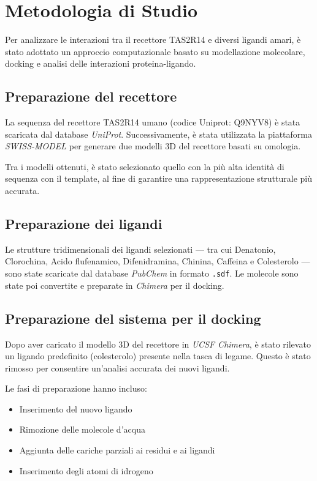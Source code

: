 \documentclass[12pt, a4paper]{book}
\begin{document}
\chapter{Metodologia di Studio}

Per analizzare le interazioni tra il recettore TAS2R14 e diversi ligandi amari, è stato adottato un approccio computazionale basato su modellazione molecolare, docking e analisi delle interazioni proteina-ligando.

\section*{Preparazione del recettore}
La sequenza del recettore TAS2R14 umano (codice Uniprot: Q9NYV8) è stata scaricata dal database \textit{UniProt}. Successivamente, è stata utilizzata la piattaforma \textit{SWISS-MODEL} per generare due modelli 3D del recettore basati su omologia.

Tra i modelli ottenuti, è stato selezionato quello con la più alta identità di sequenza con il template, al fine di garantire una rappresentazione strutturale più accurata.

\section*{Preparazione dei ligandi}
Le strutture tridimensionali dei ligandi selezionati — tra cui Denatonio, Clorochina, Acido flufenamico, Difenidramina, Chinina, Caffeina e Colesterolo — sono state scaricate dal database \textit{PubChem} in formato \texttt{.sdf}. Le molecole sono state poi convertite e preparate in \textit{Chimera} per il docking.

\section*{Preparazione del sistema per il docking}
Dopo aver caricato il modello 3D del recettore in \textit{UCSF Chimera}, è stato rilevato un ligando predefinito (colesterolo) presente nella tasca di legame. Questo è stato rimosso per consentire un’analisi accurata dei nuovi ligandi.

Le fasi di preparazione hanno incluso:
\begin{itemize}
    \item Inserimento del nuovo ligando
    \item Rimozione delle molecole d’acqua
    \item Aggiunta delle cariche parziali ai residui e ai ligandi
    \item Inserimento degli atomi di idrogeno
\end{itemize}
\end{document}
